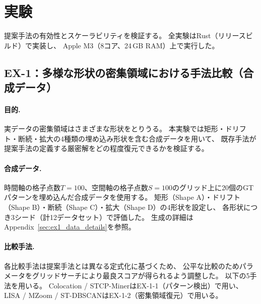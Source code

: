 \section{実験}\label{sec:experiments}

提案手法の有効性とスケーラビリティを検証する。
全実験はRust（リリースビルド）で実装し、
Apple M3（8コア、24\,GB RAM）上で実行した。

\subsection{EX-1：多様な形状の密集領域における手法比較（合成データ）}
\label{sec:ex1}\label{sec:ex1_1}

\paragraph{目的.}
実データの密集領域はさまざまな形状をとりうる。
本実験では矩形・ドリフト・断続・拡大の4種類の埋め込み形状を含む合成データを用いて、
既存手法が提案手法の定義する厳密解をどの程度復元できるかを検証する。

\paragraph{合成データ.}
時間軸の格子点数$T{=}100$、空間軸の格子点数$S{=}100$のグリッド上に20個のGTパターンを埋め込んだ合成データを使用する。
矩形（Shape A）・ドリフト（Shape B）・断続（Shape C）・拡大（Shape D）の4形状を設定し、
各形状につき3シード（計12データセット）で評価した。
生成の詳細はAppendix~\ref{sec:ex1_data_details}を参照。

\paragraph{比較手法.}
各比較手法は提案手法とは異なる定式化に基づくため、
公平な比較のためパラメータをグリッドサーチにより最良スコアが得られるよう調整した。
以下の5手法を用いる。
Colocation / STCP-MinerはEX-1-1（パターン検出）で用い、
LISA / MZoom / ST-DBSCANはEX-1-2（密集領域復元）で用いる。

